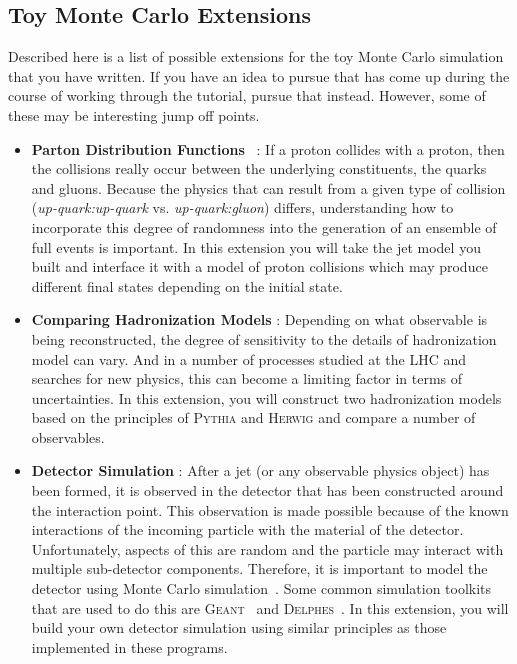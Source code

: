 \documentclass[UKenglish,texlive=2016]{\ATLASLATEXPATH atlasdoc}
\begin{document}
\subsection{Toy Monte Carlo Extensions}
\label{sec:ext1}
Described here is a list of possible extensions for the toy Monte Carlo simulation that you have written.  If you have an idea to pursue that has come up during the course of working through the tutorial, pursue that instead.  However, some of these may be interesting jump off points.
\begin{itemize}
\item \textbf{Parton Distribution Functions}~\cite{pdf1,pdf2,pdf3,pdf4} : If a proton collides with a proton, then the collisions really occur between the underlying constituents, the quarks and gluons.  Because the physics that can result from a given type of collision (\textit{up-quark:up-quark} vs. \textit{up-quark:gluon}) differs, understanding how to incorporate this degree of randomness into the generation of an ensemble of full events is important.  In this extension you will take the jet model you built and interface it with a model of proton collisions which may produce different final states depending on the initial state.
\item \textbf{Comparing Hadronization Models} : Depending on what observable is being reconstructed, the degree of sensitivity to the details of hadronization model can vary.  And in a number of processes studied at the LHC and searches for new physics, this can become a limiting factor in terms of uncertainties.  In this extension, you will construct two hadronization models based on the principles of \textsc{Pythia} and \textsc{Herwig} and compare a number of observables.
\item \textbf{Detector Simulation} : After a jet (or any observable physics object) has been formed, it is observed in the detector that has been constructed around the interaction point.  This observation is made possible because of the known interactions of the incoming particle with the material of the detector.  Unfortunately, aspects of this are random and the particle may interact with multiple sub-detector components.  Therefore, it is important to model the detector using Monte Carlo simulation~\cite{det1}.  Some common simulation toolkits that are used to do this are \textsc{Geant}~\cite{Agostinelli:2002hh} and \textsc{Delphes}~\cite{Ovyn:2009tx}.  In this extension, you will build your own detector simulation using similar principles as those implemented in these programs.

\end{itemize}
\end{document}
